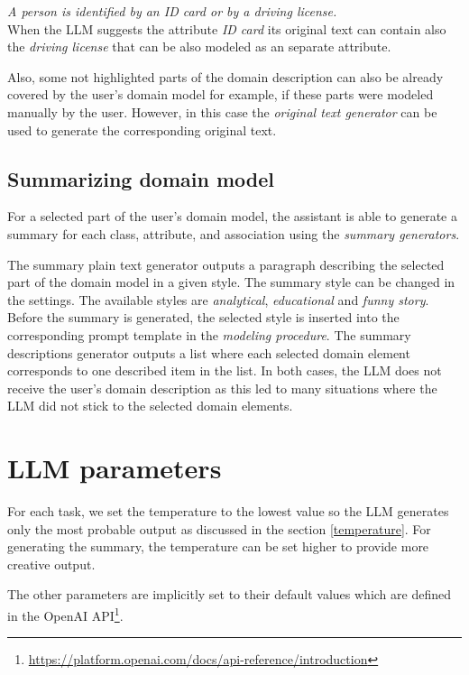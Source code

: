 \noindent{} \textit{A person is identified by an ID card or by a driving license.} \\

\noindent{} When the LLM suggests the attribute \textit{ID card} its original text can contain also the \textit{driving license} that can be also modeled as an separate attribute.

Also, some not highlighted parts of the domain description can also be already covered by the user's domain model for example, if these parts were modeled manually by the user. However, in this case the \emph{original text generator} can be used to generate the corresponding original text.


\subsection{Summarizing domain model}
\label{sec:summarising_domain_model}

For a selected part of the user's domain model, the assistant is able to generate a summary for each class, attribute, and association using the \emph{summary generators}.

The summary plain text generator outputs a paragraph describing the selected part of the domain model in a given style. The summary style can be changed in the settings. The available styles are \textit{analytical}, \textit{educational} and \textit{funny story}. Before the summary is generated, the selected style is inserted into the corresponding prompt template in the \emph{modeling procedure}. The summary descriptions generator outputs a list where each selected domain element corresponds to one described item in the list. In both cases, the LLM does not receive the user's domain description as this led to many situations where the LLM did not stick to the selected domain elements.


\section{LLM parameters}

For each task, we set the temperature to the lowest value so the LLM generates only the most probable output as discussed in the section \ref{temperature}. For generating the summary, the temperature can be set higher to provide more creative output.

The other parameters are implicitly set to their default values which are defined in the OpenAI API\footnote{\url{https://platform.openai.com/docs/api-reference/introduction}}.


